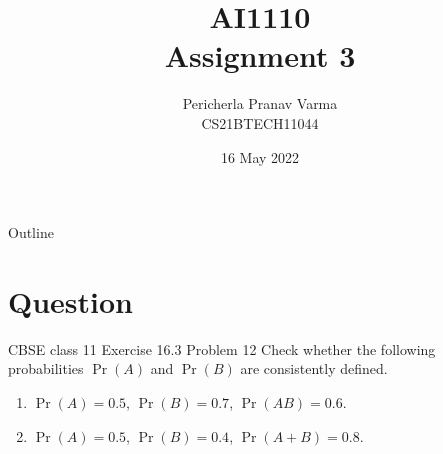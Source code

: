 \documentclass{beamer}
\title{AI1110 \\ Assignment 3}
\author{Pericherla Pranav Varma \\ CS21BTECH11044}
\date{16 May 2022}
\providecommand{\pr}[1]{\ensuremath{\Pr\left(#1\right)}}
\providecommand{\pr}[1]{\ensuremath{\Pr\left(#1\right)}}
\begin{document}
	\begin{frame}
		\titlepage
	\end{frame}
%	
	\begin{frame}{Outline}
    		\tableofcontents
	\end{frame}
%
	\section{Question}
	\begin{frame}{CBSE class 11 Exercise 16.3 Problem 12}
Check whether the following probabilities $\pr{A}$ and $\pr{B}$ are consistently defined.\\[9pt]
\begin{enumerate}[label=(\alph{enumi})]
\item $\pr{A}=0.5$, $\pr{B}=0.7$, $\pr{AB}=0.6$.%
\item $\pr{A}=0.5$, $\pr{B}=0.4$, $\pr{A+B}=0.8$.
\end{enumerate}
	\end{frame}
%
\end{document}
